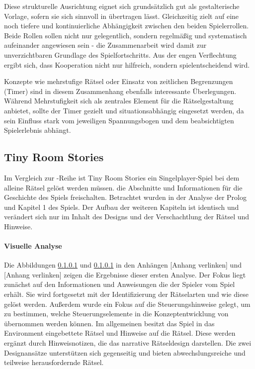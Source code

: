 Diese strukturelle Ausrichtung eignet sich grundsätzlich gut als gestalterische Vorlage, sofern sie sich sinnvoll in  übertragen lässt. Gleichzeitig zielt  auf eine noch tiefere und kontinuierliche Abhängigkeit zwischen den beiden Spielerrollen. Beide Rollen sollen nicht nur gelegentlich, sondern regelmäßig und systematisch aufeinander angewiesen sein - die Zusammenarbeit wird damit zur unverzichtbaren Grundlage des Spielfortschritts. Aus der engen Verflechtung ergibt sich, dass Kooperation nicht nur hilfreich, sondern spielentscheidend wird.

Konzepte wie mehrstufige Rätsel oder Einsatz von zeitlichen Begrenzungen (Timer) sind in diesem Zusammenhang ebenfalls interessante Überlegungen. Während Mehrstufigkeit sich als zentrales Element für die Rätselgestaltung anbietet, sollte der Timer gezielt und situationsabhängig eingesetzt werden, da sein Einfluss stark vom jeweiligen Spannungsbogen und dem beabsichtigten Spielerlebnis abhängt.

\subsection{Tiny Room Stories}
Im Vergleich zur -Reihe ist Tiny Room Stories ein Singelplayer-Spiel bei dem alleine Rätsel gelöst werden müssen. die Abschnitte und Informationen für die Geschichte des Spiels freischalten. Betrachtet wurden in der Analyse der Prolog und Kapitel 1 des Spiels. Der Aufbau der weiteren Kapiteln ist identisch und verändert sich nur im Inhalt des Designs und der Verschachtlung der Rätsel und Hinweise.

\paragraph{Visuelle Analyse}
Die Abbildungen \ref{} und \ref{} in den Anhängen [Anhang verlinken] und [Anhang verlinken] zeigen die Ergebnisse dieser ersten Analyse. Der Fokus liegt zunächst auf den Informationen und Anweisungen die der Spieler vom Spiel erhält. Sie wird fortgesetzt mit der Identifizierung der Rätselarten und wie diese gelöst werden. Außerdem wurde ein Fokus auf die Steuerungshinweise gelegt, um zu bestimmen, welche Steuerungselemente in die Konzeptentwicklung von  übernommen werden können. Im allgemeinen besitzt das Spiel  in das Environment eingebettete Rätsel und Hinweise auf die Rätsel. Diese werden ergänzt durch Hinweisnotizen, die das narrative Rätseldesign darstellen. Die zwei Designansätze unterstützen sich gegenseitig und bieten abwechslungsreiche und teilweise herausfordernde Rätsel.


